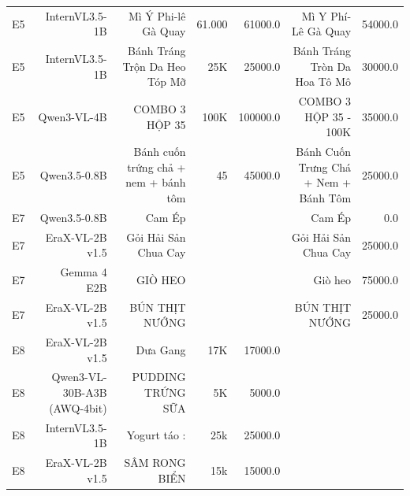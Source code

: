 \begin{table}[t]
\begin{tabular}{lrrrrrr}
E5 & InternVL3.5-1B & Mì Ý Phi-lê Gà Quay & 61.000 & 61000.0 & Mì Y Phí- Lê Gà Quay & 54000.0 \\
E5 & InternVL3.5-1B & Bánh Tráng Trộn Da Heo Tóp Mỡ & 25K & 25000.0 & Bánh Tráng Tròn Da Hoa Tô Mô & 30000.0 \\
E5 & Qwen3-VL-4B & COMBO 3 HỘP 35 & 100K & 100000.0 & COMBO 3 HỘP 35 - 100K & 35000.0 \\
E5 & Qwen3.5-0.8B & Bánh cuốn trứng chả + nem + bánh tôm & 45 & 45000.0 & Bánh Cuốn Trưng Chá + Nem + Bánh Tôm & 25000.0 \\
E7 & Qwen3.5-0.8B & Cam Ép &  &  & Cam Ép & 0.0 \\
E7 & EraX-VL-2B v1.5 & Gỏi Hải Sản Chua Cay &  &  & Gỏi Hải Sản Chua Cay & 25000.0 \\
E7 & Gemma 4 E2B & GIÒ HEO &  &  & Giò heo & 75000.0 \\
E7 & EraX-VL-2B v1.5 & BÚN THỊT NƯỚNG &  &  & BÚN THỊT NƯỚNG & 25000.0 \\
E8 & EraX-VL-2B v1.5 & Dưa Gang & 17K & 17000.0 &  &  \\
E8 & Qwen3-VL-30B-A3B (AWQ-4bit) & PUDDING TRỨNG SỮA & 5K & 5000.0 &  &  \\
E8 & InternVL3.5-1B & Yogurt táo : & 25k & 25000.0 &  &  \\
E8 & EraX-VL-2B v1.5 & SÂM RONG BIỂN & 15k & 15000.0 &  &  \\
\bottomrule
\end{tabular}
\end{table}
